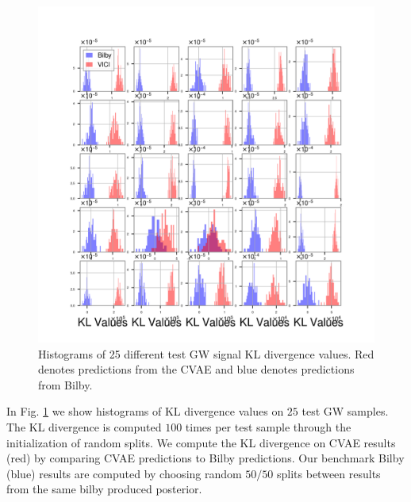 \documentclass[%
showpacs,
 amsmath,amssymb,
 aps,
 twocolumn,
 prl,
 reprint,
floatfix,
]{revtex4-1}
\begin{document}
%
%
\begin{figure}
    \includegraphics[width=\columnwidth]{images/hist-kl_0.png}
    \caption{\label{fig:kl_results} Histograms of 
    25 different test GW signal KL divergence values. 
    Red denotes predictions from the CVAE and blue 
    denotes predictions from Bilby.}
\end{figure}

In Fig. \ref{fig:kl_results} we show histograms of KL divergence 
values on $25$ test GW samples. The KL divergence is computed 
$100$ times per test sample through the initialization of random splits. We compute 
the KL divergence on CVAE results (red) by comparing CVAE predictions 
to Bilby predictions. Our benchmark Bilby (blue) results are computed by choosing 
random $50/50$ splits between results from the same bilby produced 
posterior. 
\end{document}
